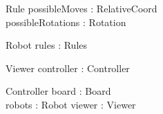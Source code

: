 \documentclass[12pt]{article}
\begin{document}
\begin{schema}{Rule}
possibleMoves : \power RelativeCoord \\
possibleRotations : \power Rotation
\end{schema}

\begin{schema}{Robot}
rules : Rules
\end{schema}

\begin{schema}{Viewer}
controller : Controller
\end{schema}

\begin{schema}{Controller}
board : Board \\
robots : \power Robot
viewer : Viewer
\end{schema}
\end{document}
